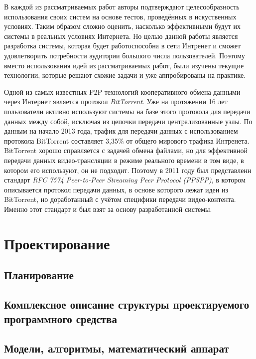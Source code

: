 	В каждой из рассматриваемых работ авторы подтверждают целесообразность использования своих систем на основе
	тестов, проведённых в искуственных условиях. Таким образом сложно оценить, насколько эффективными будут
	их системы в реальных условиях Интернета. Но целью данной работы является разработка системы, которая будет
	работоспособна в сети Интренет и сможет удовлетворить потребности аудитории большого числа пользователей.
	Поэтому вместо использования идей из рассматриваемых работ, были изучены текущие технологии, которые решают
	схожие задачи и уже аппробированы на практике.

	Одной из самых известных P2P-технологий кооперативного обмена данными через Интернет является протокол
	\textit{BitTorrent}. Уже на протяжении 16 лет пользователи активно используют системы на базе этого протокола для
	передачи данных между собой, исключая из цепочки передачи централизованные узлы. По данным на начало 2013 года,
	трафик для передачи данных с использованием протокола BitTorrent составляет 3,35\% от общего мирового трафика
	Интренета. BitTorrent хорошо справляется с задачей обмена файлами, но для эффективной передачи данных
	видео-трансляции в режиме реального времени в том виде, в котором его используют, он не подходит. Поэтому в 2011
	году был представленн стандарт \textit{RFC 7574 Peer-to-Peer Streaming Peer Protocol (PPSPP)}, в котором описывается
	протокол передачи данных, в основе которого лежат идеи из BitTorrent, но доработанный с учётом специфики передачи
	видео-контента. Именно этот стандарт и был взят за основу разработанной системы.

\section{Проектирование}
	\subsection{Планирование}
	\subsection{Комплексное описание структуры проектируемого программного средства}
	\subsection{Модели, алгоритмы, математический аппарат}
